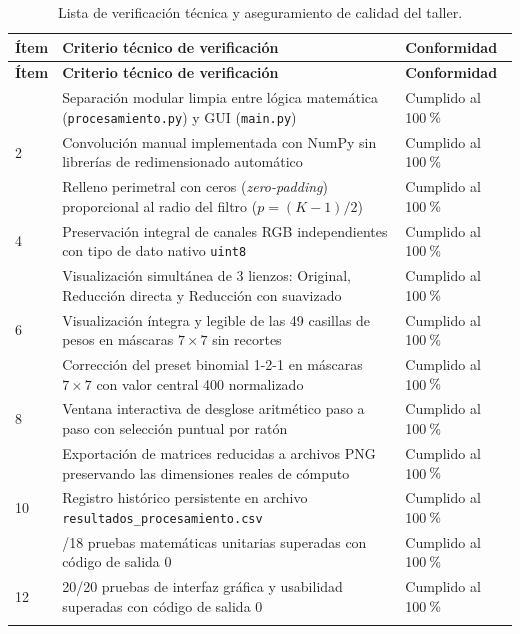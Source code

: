 \documentclass[11pt]{article}
\newcommand{\pct}{\ensuremath{\mathrm{\char37}}}
\begin{document}
\begin{longtable}{>{\centering\arraybackslash}p{1.2cm}>{\raggedright\arraybackslash}p{9.8cm}>{\centering\arraybackslash}p{2.8cm}}
\caption{Lista de verificación técnica y aseguramiento de calidad del taller.}\\
\toprule
\textbf{Ítem} & \textbf{Criterio técnico de verificación} & \textbf{Conformidad} \\
\midrule\endfirsthead
\toprule
\textbf{Ítem} & \textbf{Criterio técnico de verificación} & \textbf{Conformidad} \\
\midrule\endhead
1 & Separación modular limpia entre lógica matemática (\texttt{procesamiento.py}) y GUI (\texttt{main.py}) & Cumplido al 100\,\pct \\
\cellcolor{azulClaro!40}2 & \cellcolor{azulClaro!40}Convolución manual implementada con NumPy sin librerías de redimensionado automático & \cellcolor{azulClaro!40}Cumplido al 100\,\pct \\
3 & Relleno perimetral con ceros (\textit{zero-padding}) proporcional al radio del filtro ($p=(K-1)/2$) & Cumplido al 100\,\pct \\
\cellcolor{azulClaro!40}4 & \cellcolor{azulClaro!40}Preservación integral de canales RGB independientes con tipo de dato nativo \texttt{uint8} & \cellcolor{azulClaro!40}Cumplido al 100\,\pct \\
5 & Visualización simultánea de 3 lienzos: Original, Reducción directa y Reducción con suavizado & Cumplido al 100\,\pct \\
\cellcolor{azulClaro!40}6 & \cellcolor{azulClaro!40}Visualización íntegra y legible de las 49 casillas de pesos en máscaras $7\times7$ sin recortes & \cellcolor{azulClaro!40}Cumplido al 100\,\pct \\
7 & Corrección del preset binomial 1-2-1 en máscaras $7\times7$ con valor central 400 normalizado & Cumplido al 100\,\pct \\
\cellcolor{azulClaro!40}8 & \cellcolor{azulClaro!40}Ventana interactiva de desglose aritmético paso a paso con selección puntual por ratón & \cellcolor{azulClaro!40}Cumplido al 100\,\pct \\
9 & Exportación de matrices reducidas a archivos PNG preservando las dimensiones reales de cómputo & Cumplido al 100\,\pct \\
\cellcolor{azulClaro!40}10 & \cellcolor{azulClaro!40}Registro histórico persistente en archivo \texttt{resultados\_procesamiento.csv} & \cellcolor{azulClaro!40}Cumplido al 100\,\pct \\
11 & 18/18 pruebas matemáticas unitarias superadas con código de salida 0 & Cumplido al 100\,\pct \\
\cellcolor{azulClaro!40}12 & \cellcolor{azulClaro!40}20/20 pruebas de interfaz gráfica y usabilidad superadas con código de salida 0 & \cellcolor{azulClaro!40}Cumplido al 100\,\pct \\
\bottomrule
\label{tab:control_calidad_entrega}
\end{longtable}
\end{document}
